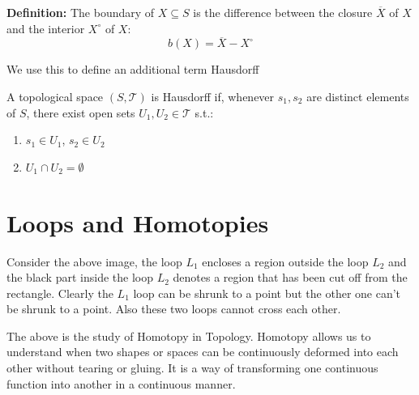 \documentclass{article}
\begin{document}
\begin{theorem}
    \textbf{Definition:} The boundary of \(X \subseteq S\) is the difference between the closure \(\overline{X}\) of \(X\) and the interior \(X^\circ\) of \(X\):
\[
b(X) = \overline{X} - X^\circ
\]

\end{theorem}

We use this to define an additional term Hausdorff

\begin{theorem}
A topological space $(S,\mathcal{T})$ 
is Hausdorff if, whenever 
$s_1, s_2$ are distinct elements 
of $S$, there exist open sets 
$U_1, U_2 \in \mathcal{T}$ s.t.:
\begin{enumerate}
    \item $s_1 \in U_1$, $s_2 \in U_2$
    \item $U_1 \cap U_2 = \emptyset$
\end{enumerate}

\end{theorem}

\section{Loops and Homotopies}


Consider the above image, the loop \( L_1 \) encloses a region outside the loop \(L_2 \) and the black part inside the loop \( L_2 \) denotes a region that has been cut off from the rectangle. Clearly the \(L_1\) loop can be shrunk to a point but the other one can't be shrunk to a point. Also these two loops cannot cross each other. 

The above is the study of Homotopy in Topology. Homotopy allows us to understand when two shapes or spaces can be continuously deformed into each other without tearing or gluing. It is a way of transforming one continuous function into another in a continuous manner. 
\end{document}
